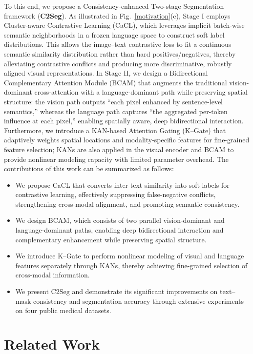 \documentclass{article} %
\begin{document}
To this end, we propose a Consistency-enhanced Two-stage Segmentation framework (\textbf{C2Seg}). As illustrated in Fig.~\ref{motivation}(c), Stage I employs Cluster-aware Contrastive Learning (CaCL), which leverages implicit batch-wise semantic neighborhoods in a frozen language space to construct soft label distributions. This allows the image--text contrastive loss to fit a continuous semantic similarity distribution rather than hard positives/negatives, thereby alleviating contrastive conflicts and producing more discriminative, robustly aligned visual representations. In Stage II, we design a Bidirectional Complementary Attention Module (BCAM) that augments the traditional vision-dominant cross-attention with a language-dominant path while preserving spatial structure: the vision path outputs ``each pixel enhanced by sentence-level semantics,'' whereas the language path captures ``the aggregated per-token influence at each pixel,'' enabling spatially aware, deep bidirectional interaction. Furthermore, we introduce a KAN-based Attention Gating (K--Gate) that adaptively weights spatial locations and modality-specific features for fine-grained feature selection; KANs are also applied in the visual encoder and BCAM to provide nonlinear modeling capacity with limited parameter overhead. The contributions of this work can be summarized as follows:

\begin{itemize}
    \item We propose CaCL that converts inter-text similarity into soft labels for contrastive learning, effectively suppressing false-negative conflicts, strengthening cross-modal alignment, and promoting semantic consistency.
    \item We design BCAM, which consists of two parallel vision-dominant and language-dominant paths, enabling deep bidirectional interaction and complementary enhancement while preserving spatial structure.
    \item We introduce K--Gate to perform nonlinear modeling of visual and language features separately through KANs, thereby achieving fine-grained selection of cross-modal information.
    \item We present C2Seg and demonstrate its significant improvements on text--mask consistency and segmentation accuracy through extensive experiments on four public medical datasets.
\end{itemize}

\section{Related Work}
\end{document}
